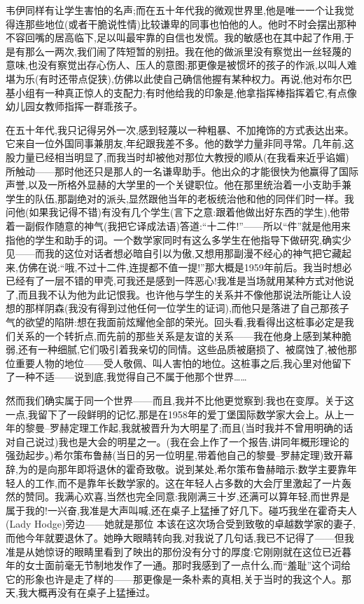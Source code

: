  韦伊同样有让学生害怕的名声;而在五十年代我的微观世界里,他是唯一一个让我觉得连那些地位(或者干脆说性情)比较谦卑的同事也怕他的人。他时不时会摆出那种不容回嘴的居高临下,足以叫最牢靠的自信也发慌。我的敏感也在其中起了作用,于是有那么一两次,我们闹了阵短暂的别扭。我在他的做派里没有察觉出一丝轻蔑的意味,也没有察觉出存心伤人、压人的意图;那更像是被惯坏的孩子的作派,以叫人难堪为乐(有时还带点促狭),仿佛以此使自己确信他握有某种权力。再说,他对布尔巴基小组有一种真正惊人的支配力;有时他给我的印象是,他拿指挥棒指挥着它,有点像幼儿园女教师指挥一群乖孩子。

在五十年代,我只记得另外一次,感到轻蔑以一种粗暴、不加掩饰的方式表达出来。它来自一位外国同事兼朋友,年纪跟我差不多。他的数学力量非同寻常。几年前,这股力量已经相当明显了,而我当时却被他对那位大教授的顺从(在我看来近乎谄媚)所触动——那时他还只是那人的一名谦卑助手。他出众的才能很快为他赢得了国际声誉,以及一所格外显赫的大学里的一个关键职位。他在那里统治着一小支助手兼学生的队伍,那副绝对的派头,显然跟他当年的老板统治他和他的同伴们时一样。我问他(如果我记得不错)有没有几个学生(言下之意:跟着他做出好东西的学生),他带着一副假作随意的神气(我把它译成法语)答道:“十二件!”——所以“件”就是他用来指他的学生和助手的词。一个数学家同时有这么多学生在他指导下做研究,确实少见——而我的这位对话者想必暗自引以为傲,又想用那副漫不经心的神气把它藏起来,仿佛在说:“哦,不过十二件,连提都不值一提!”那大概是1959年前后。我当时想必已经有了一层不错的甲壳,可我还是感到一阵恶心!我准是当场就用某种方式对他说了,而且我不认为他为此记恨我。也许他与学生的关系并不像他那说法所能让人设想的那样阴森(我没有得到过他任何一位学生的证词),而他只是落进了自己那孩子气的欲望的陷阱:想在我面前炫耀他全部的荣光。回头看,我看得出这桩事必定是我们关系的一个转折点,而先前的那些关系是友谊的关系——我在他身上感到某种脆弱,还有一种细腻,它们吸引着我亲切的同情。这些品质被磨损了、被腐蚀了,被他那位重要人物的地位——受人敬佩、叫人害怕的地位。这桩事之后,我心里对他留下了一种不适——说到底,我觉得自己不属于他那个世界……

 然而我们确实属于同一个世界——而且,我并不比他更觉察到:我也在变厚。关于这一点,我留下了一段鲜明的记忆,那是在1958年的爱丁堡国际数学家大会上。从上一年的黎曼–罗赫定理工作起,我就被晋升为大明星了;而且(当时我并不曾用明确的话对自己说过)我也是大会的明星之一。(我在会上作了一个报告,讲同年概形理论的强劲起步。)希尔策布鲁赫(当日的另一位明星,带着他自己的黎曼–罗赫定理)致开幕辞,为的是向那年即将退休的霍奇致敬。说到某处,希尔策布鲁赫暗示:数学主要靠年轻人的工作,而不是靠年长数学家的。这在年轻人占多数的大会厅里激起了一片轰然的赞同。我满心欢喜,当然也完全同意:我刚满三十岁,还满可以算年轻,而世界是属于我的!一兴奋,我准是大声叫喊,还在桌子上猛捶了好几下。碰巧我坐在霍奇夫人(Lady Hodge)旁边——她就是那位
 本该在这次场合受到致敬的卓越数学家的妻子,而他今年就要退休了。她睁大眼睛转向我,对我说了几句话,我已不记得了——但我准是从她惊讶的眼睛里看到了映出的那份没有分寸的厚度:它刚刚就在这位已近暮年的女士面前毫无节制地发作了一通。那时我感到了一点什么,而“羞耻”这个词给它的形象也许是走了样的——那更像是一条朴素的真相,关于当时的我这个人。那天,我大概再没有在桌子上猛捶过。


